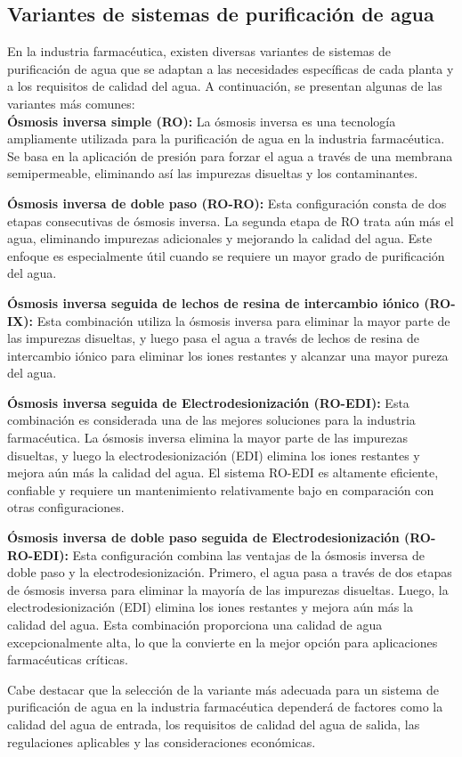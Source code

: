 \subsection{Variantes de sistemas de purificación de agua}

En la industria farmacéutica, existen diversas variantes de sistemas de purificación de agua que se adaptan a las necesidades específicas de cada planta y a los requisitos de calidad del agua. A continuación, se presentan algunas de las variantes más comunes:\\

\textbf{Ósmosis inversa simple (RO):} La ósmosis inversa es una tecnología ampliamente utilizada para la purificación de agua en la industria farmacéutica. Se basa en la aplicación de presión para forzar el agua a través de una membrana semipermeable, eliminando así las impurezas disueltas y los contaminantes.

\textbf{Ósmosis inversa de doble paso (RO-RO):} Esta configuración consta de dos etapas consecutivas de ósmosis inversa. La segunda etapa de RO trata aún más el agua, eliminando impurezas adicionales y mejorando la calidad del agua. Este enfoque es especialmente útil cuando se requiere un mayor grado de purificación del agua.

\textbf{Ósmosis inversa seguida de lechos de resina de intercambio iónico (RO-IX):} Esta combinación utiliza la ósmosis inversa para eliminar la mayor parte de las impurezas disueltas, y luego pasa el agua a través de lechos de resina de intercambio iónico para eliminar los iones restantes y alcanzar una mayor pureza del agua.

\textbf{Ósmosis inversa seguida de Electrodesionización (RO-EDI):} Esta combinación es considerada una de las mejores soluciones para la industria farmacéutica. La ósmosis inversa elimina la mayor parte de las impurezas disueltas, y luego la electrodesionización (EDI) elimina los iones restantes y mejora aún más la calidad del agua. El sistema RO-EDI es altamente eficiente, confiable y requiere un mantenimiento relativamente bajo en comparación con otras configuraciones.

\textbf{Ósmosis inversa de doble paso seguida de Electrodesionización (RO-RO-EDI):} Esta configuración combina las ventajas de la ósmosis inversa de doble paso y la electrodesionización. Primero, el agua pasa a través de dos etapas de ósmosis inversa para eliminar la mayoría de las impurezas disueltas. Luego, la electrodesionización (EDI) elimina los iones restantes y mejora aún más la calidad del agua. Esta combinación proporciona una calidad de agua excepcionalmente alta, lo que la convierte en la mejor opción para aplicaciones farmacéuticas críticas.


Cabe destacar que la selección de la variante más adecuada para un sistema de purificación de agua en la industria farmacéutica dependerá de factores como la calidad del agua de entrada, los requisitos de calidad del agua de salida, las regulaciones aplicables y las consideraciones económicas.
